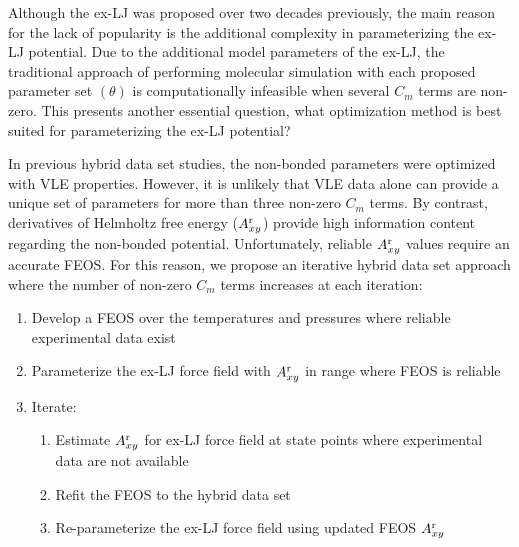 \documentclass[11pt,a4paper]{article}
\begin{document}

Although the ex-LJ was proposed over two decades previously, the main reason for the lack of popularity is the additional complexity in parameterizing the ex-LJ potential. Due to the additional model parameters of the ex-LJ, the traditional approach of performing molecular simulation with each proposed parameter set $(\theta)$ is computationally infeasible when several $C_m$ terms are non-zero. This presents another essential question, what optimization method is best suited for parameterizing the ex-LJ potential?

In previous hybrid data set studies, the non-bonded parameters were optimized with VLE properties. However, it is unlikely that VLE data alone can provide a unique set of parameters for more than three non-zero $C_m$ terms. By contrast, derivatives of Helmholtz free energy ($A_{xy}^{\rm r}$) provide high information content regarding the non-bonded potential. Unfortunately, reliable $A_{xy}^{\rm r}$ values require an accurate FEOS. For this reason, we propose an iterative hybrid data set approach where the number of non-zero $C_m$ terms increases at each iteration:

\begin{enumerate}
	\item Develop a FEOS over the temperatures and pressures where reliable experimental data exist
	\item Parameterize the ex-LJ force field with $A_{xy}^{\rm r}$ in range where FEOS is reliable
	\item Iterate:
	\begin{enumerate}
		\item Estimate $A_{xy}^{\rm r}$ for ex-LJ force field at state points where experimental data are not available
		\item Refit the FEOS to the hybrid data set
		\item Re-parameterize the ex-LJ force field using updated FEOS $A_{xy}^{\rm r}$
	\end{enumerate}
\end{enumerate}




\end{document}
